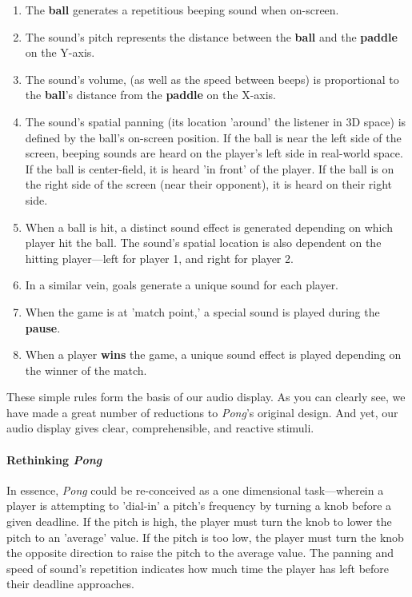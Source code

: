 \documentclass{report}
\newcommand{\state}[1]{\textbf{#1}}
\newcommand{\pad}{\textbf{paddle}\xspace}
\newcommand{\ball}{\textbf{ball}\xspace}
\begin{document}
\begin{enumerate}
    \item The \ball generates a repetitious beeping sound when on-screen.
    \item The sound's pitch represents the distance between the \ball and the \pad on the Y-axis.
    \item The sound's volume, (as well as the speed between beeps) is proportional to the \ball's distance from the \pad on the X-axis.
    \item The sound's spatial panning (its location 'around' the listener in 3D space) is defined by the ball's on-screen position. If the ball is near the left side of the screen, beeping sounds are heard on the player's left side in real-world space. If the ball is center-field, it is heard 'in front' of the player. If the ball is on the right side of the screen (near their opponent), it is heard on their right side.  
    \item When a ball is hit, a distinct sound effect is generated depending on which player hit the ball. The sound's spatial location is also dependent on the hitting player---left for player 1, and right for player 2.
    \item In a similar vein, goals generate a unique sound for each player.
    \item When the game is at 'match point,' a special sound is played during the \state{pause}.
    \item When a player \state{wins} the game, a unique sound effect is played depending on the winner of the match.
\end{enumerate}

These simple rules form the basis of our audio display. As you can clearly see, we have made a great number of reductions to \emph{Pong}'s original design. And yet, our audio display gives clear, comprehensible, and reactive stimuli. 

\paragraph{Rethinking \emph{Pong}}

In essence, \emph{Pong} could be re-conceived as a one dimensional task---wherein a player is attempting to 'dial-in' a pitch's frequency by turning a knob before a given deadline. If the pitch is high, the player must turn the knob to lower the pitch to an 'average' value. If the pitch is too low, the player must turn the knob the opposite direction to raise the pitch to the average value. The panning and speed of sound's repetition indicates how much time the player has left before their deadline approaches.
\end{document}
